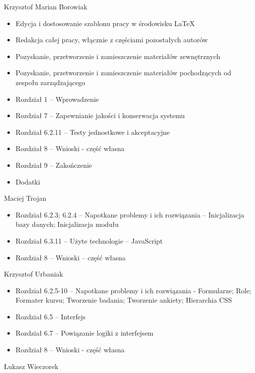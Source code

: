\begin{description}
\item Krzysztof Marian Borowiak

\begin{itemize}
\item Edycja i dostosowanie szablonu pracy w środowisku \LaTeX
\item Redakcja całej pracy, włącznie z częściami pozostałych autorów
\item Pozyskanie, przetworzenie i zamieszczenie materiałów zewnętrznych
\item Pozyskanie, przetworzenie i zamieszczenie materiałów pochodzących od zespołu zarządzającego
\item Rozdział 1 -- Wprowadzenie
\item Rozdział 7 -- Zapewnianie jakości i konserwacja systemu
\item Rozdział 6.2.11 -- Testy jednostkowe i akceptacyjne
\item Rozdział 8 -- Wnioski - część własna
\item Rozdział 9 -- Zakończenie
\item Dodatki
\end{itemize}
\noindent

\item Maciej Trojan

\begin{itemize}
\item Rozdział 6.2.3; 6.2.4 -- Napotkane problemy i ich rozwiązania -- Inicjalizacja bazy danych; Inicjalizacja modułu
\item Rozdział 6.3.11 -- Użyte technologie -- JavaScript
\item Rozdział 8 -- Wnioski -- część własna
\end{itemize}
\noindent

\item Krzysztof Urbaniak

\begin{itemize}
\item Rozdział 6.2.5-10 -- Napotkane problemy i ich rozwiązania - Formularze; Role; Formater kursu; Tworzenie badania; Tworzenie ankiety; Hierarchia CSS
\item Rozdział 6.5 -- Interfejs
\item Rozdział 6.7 -- Powiązanie logiki z interfejsem
\item Rozdział 8 -- Wnioski - część własna
\end{itemize}
\noindent

\item Łukasz Wieczorek


\end{description}

